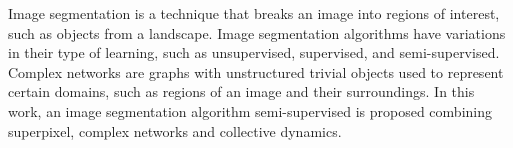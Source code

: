 Image segmentation is a technique that breaks an image into regions of
interest, such as objects from a landscape. Image segmentation
algorithms have variations in their type of learning, such as
unsupervised, supervised, and semi-supervised. Complex networks are
graphs with unstructured trivial objects used to represent certain
domains, such as regions of an image and their surroundings. In this
work, an image segmentation algorithm semi-supervised is proposed
combining superpixel, complex networks and collective dynamics.

